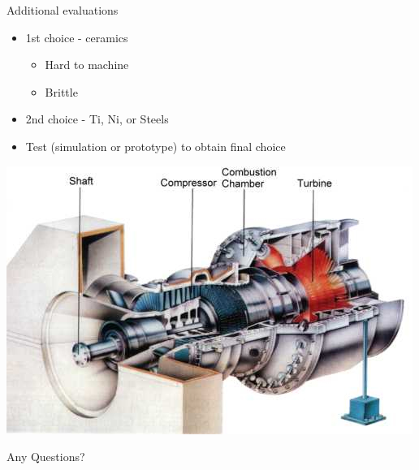 \documentclass[10pt, svgnames]{beamer}
\begin{document}
\begin{frame}[label={sec:orgdebd44d}]{Additional evaluations}
\begin{itemize}
\item 1st choice - ceramics

\begin{itemize}
\item Hard to machine
\item Brittle
\end{itemize}

\item 2nd choice - Ti, Ni, or Steels
\item Test (simulation or prototype) to obtain final choice
\end{itemize}

\centering
\includegraphics[height=0.5\textheight]{pictures/turbine-shaft}
\end{frame}


\begin{frame}[label={sec:orga759102}]{}
\Huge\centering Any Questions?
\end{frame}
\end{document}
